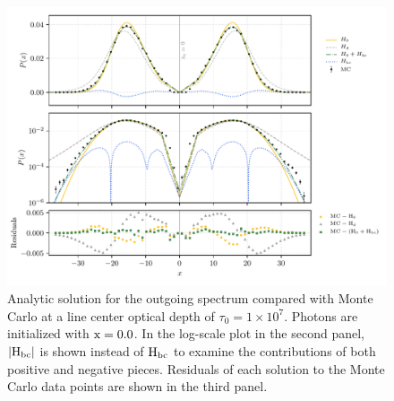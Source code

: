 \documentclass{aastex63}
\begin{document}
\begin{figure}
    \centering
    \includegraphics{final_residual.pdf}
    \caption{Analytic solution for the outgoing spectrum compared with Monte Carlo at a line center optical depth of $\tau_0 = 1 \times 10^7$. Photons are initialized with $\rm x = 0.0$. In the log-scale plot in the second panel, $|\rm H_{bc}|$ is shown instead of $\rm H_{bc}$ to examine the contributions of both positive and negative pieces. Residuals of each solution to the Monte Carlo data points are shown in the third panel.} 
    \label{fig:sol_mc_residual_0}
\end{figure}
\end{document}
